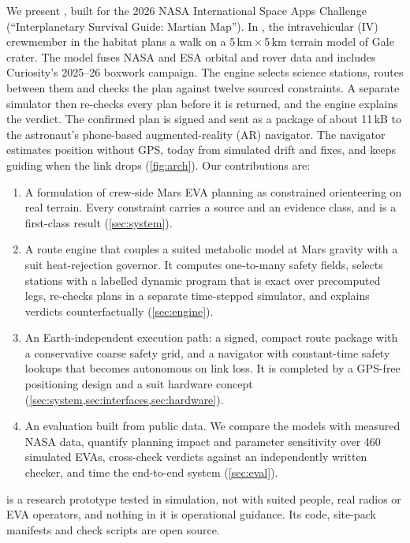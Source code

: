 We present \Marswalk, built for the 2026 NASA International Space Apps Challenge (``Interplanetary Survival Guide: Martian Map''). In \Marswalk, the intravehicular (IV) crewmember in the habitat plans a walk on a 5\,km\,$\times$\,5\,km terrain model of Gale crater. The model fuses NASA and ESA orbital and rover data and includes Curiosity's 2025--26 boxwork campaign. The engine selects science stations, routes between them and checks the plan against twelve sourced constraints. A separate simulator then re-checks every plan before it is returned, and the engine explains the verdict. The confirmed plan is signed and sent as a package of about 11\,kB to the astronaut's phone-based augmented-reality (AR) navigator. The navigator estimates position without GPS, today from simulated drift and fixes, and keeps guiding when the link drops (\cref{fig:arch}). Our contributions are:
\begin{enumerate}[label=(\arabic*)]
  \item A formulation of crew-side Mars EVA planning as constrained orienteering on real terrain. Every constraint carries a source and an evidence class, and \stayin is a first-class result (\cref{sec:system}).
  \item A route engine that couples a suited metabolic model at Mars gravity with a suit heat-rejection governor. It computes one-to-many safety fields, selects stations with a labelled dynamic program that is exact over precomputed legs, re-checks plans in a separate time-stepped simulator, and explains verdicts counterfactually (\cref{sec:engine}).
  \item An Earth-independent execution path: a signed, compact route package with a conservative coarse safety grid, and a navigator with constant-time safety lookups that becomes autonomous on link loss. It is completed by a GPS-free positioning design and a suit hardware concept (\cref{sec:system,sec:interfaces,sec:hardware}).
  \item An evaluation built from public data. We compare the models with measured NASA data, quantify planning impact and parameter sensitivity over 460 simulated EVAs, cross-check verdicts against an independently written checker, and time the end-to-end system (\cref{sec:eval}).
\end{enumerate}
\Marswalk is a research prototype tested in simulation, not with suited people, real radios or EVA operators, and nothing in it is operational guidance. Its code, site-pack manifests and check scripts are open source.
